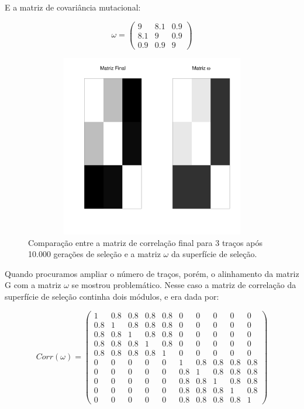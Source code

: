 E a matriz de covariância mutacional: 

\begin{equation}
\omega = \left( \begin{smallmatrix} 9 & 8.1 & 0.9\\  8.1 & 9 & 0.9 \\ 0.9 & 0.9 & 9 \end{smallmatrix}  \right)
\end{equation}


\begin{figure}[htbp]
  \centering
  \includegraphics[width=150mm, height=80mm]{figuras/Mat3tracos}
   \caption{Comparação entre a matriz de correlação final para 3
   traços após 10.000
   gerações de seleção e a matriz $\omega$ da superfície de seleção.}
  \label{MatJones3tracos}
\end{figure}


Quando procuramos ampliar o número de traços, porém, o alinhamento da
matriz G com a matriz $\omega$ se mostrou problemático. 
Nesse caso a matriz de correlação da superfície de seleção continha dois
módulos, e era dada por:

\begin{equation}
Corr(\omega) = \left( 
\begin{smallmatrix} 
1 & 0.8 & 0.8 & 0.8 & 0.8 & 0 & 0 & 0 & 0 & 0\\  
0.8 & 1 & 0.8 & 0.8 & 0.8 & 0 & 0 & 0 & 0 & 0\\  
0.8 & 0.8 & 1 & 0.8 & 0.8 & 0 & 0 & 0 & 0 & 0\\  
0.8 & 0.8 & 0.8 & 1 & 0.8 & 0 & 0 & 0 & 0 & 0\\  
0.8 & 0.8 & 0.8 & 0.8 & 1 & 0 & 0 & 0 & 0 & 0\\  
0 & 0 & 0 & 0 & 0 & 1 & 0.8 & 0.8 & 0.8 & 0.8\\ 
0 & 0 & 0 & 0 & 0 & 0.8 & 1 & 0.8 & 0.8 & 0.8\\
0 & 0 & 0 & 0 & 0 & 0.8 & 0.8 & 1 & 0.8 & 0.8\\
0 & 0 & 0 & 0 & 0 & 0.8 & 0.8 & 0.8 & 1 & 0.8\\
0 & 0 & 0 & 0 & 0 & 0.8 & 0.8 & 0.8 & 0.8 & 1
\end{smallmatrix}  \right)
\label{matw}
\end{equation}


